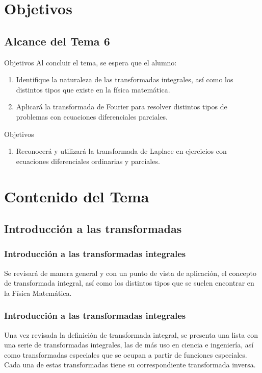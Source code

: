 \documentclass[12pt]{beamer}
\begin{document}
\section{Objetivos}
\subsection{Alcance del Tema 6}

\begin{frame}{Objetivos}
Al concluir el tema, se espera que el alumno:
\begin{enumerate}[<+->]
\item Identifique la naturaleza de las transformadas integrales, así como los distintos tipos que existe en la física matemática.
\item Aplicará la transformada de Fourier para resolver distintos tipos de problemas con ecuaciones diferenciales parciales.
\seti
\end{enumerate}
\end{frame}
\begin{frame}{Objetivos}
\begin{enumerate}[<+->]  
\conti
\item Reconocerá y utilizará la transformada de Laplace en ejercicios con ecuaciones diferenciales ordinarias y parciales.
\end{enumerate}
\end{frame}

\section{Contenido del Tema}
\subsection{Introducción a las transformadas}

\begin{frame}
\frametitle{Introducción a las transformadas integrales}
Se revisará de manera general y con un punto de vista de aplicación, el concepto de transformada integral, así como los distintos tipos que se suelen encontrar en la Física Matemática.
\end{frame}
\begin{frame}
\frametitle{Introducción a las transformadas integrales}
Una vez revisada la definición de transformada integral, se presenta una lista con una serie de transformadas integrales, las de más uso en ciencia e ingeniería, así como transformadas especiales que se ocupan a partir de funciones especiales.
\\
\bigskip
\pause
Cada una de estas transformadas tiene su correspondiente transformada inversa.
\end{frame}
\end{document}
